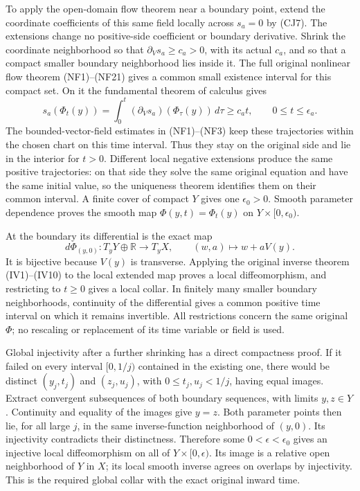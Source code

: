 \documentclass[
  11pt,
]{article}
\begin{document}
To apply the open-domain flow theorem near a boundary point, extend the
coordinate coefficients of this same field locally across \(s_a=0\) by
(CJ7). The extensions change no positive-side coefficient or boundary
derivative. Shrink the coordinate neighborhood so that
\(\partial_Vs_a\geq c_a>0\), with its actual \(c_a\), and so that a
compact smaller boundary neighborhood lies inside it. The full original
nonlinear flow theorem (NF1)--(NF21) gives a common small existence
interval for this compact set. On it the fundamental theorem of calculus
gives \[
 s_a(\Phi_t(y))=\int_0^t
               (\partial_Vs_a)(\Phi_\tau(y))\,d\tau
       \geq c_at,\qquad 0\leq t\leq\epsilon_a .
 \tag{CJ9}
\] The bounded-vector-field estimates in (NF1)--(NF3) keep these
trajectories within the chosen chart on this time interval. Thus they
stay on the original side and lie in the interior for \(t>0\). Different
local negative extensions produce the same positive trajectories: on
that side they solve the same original equation and have the same
initial value, so the uniqueness theorem identifies them on their common
interval. A finite cover of compact \(Y\) gives one \(\epsilon_0>0\).
Smooth parameter dependence proves the smooth map
\(\Phi(y,t)=\Phi_t(y)\) on \(Y\times[0,\epsilon_0)\).

At the boundary its differential is the exact map \[
 d\Phi_{(y,0)}:T_yY\oplus\mathbb R\longrightarrow T_yX,
       \qquad (w,a)\longmapsto w+aV(y).
 \tag{CJ10}
\] It is bijective because \(V(y)\) is transverse. Applying the original
inverse theorem (IV1)--(IV10) to the local extended map proves a local
diffeomorphism, and restricting to \(t\geq0\) gives a local collar. In
finitely many smaller boundary neighborhoods, continuity of the
differential gives a common positive time interval on which it remains
invertible. All restrictions concern the same original \(\Phi\); no
rescaling or replacement of its time variable or field is used.

Global injectivity after a further shrinking has a direct compactness
proof. If it failed on every interval \([0,1/j)\) contained in the
existing one, there would be distinct \((y_j,t_j)\) and \((z_j,u_j)\),
with \(0\leq t_j,u_j<1/j\), having equal images. Extract convergent
subsequences of both boundary sequences, with limits \(y,z\in Y\).
Continuity and equality of the images give \(y=z\). Both parameter
points then lie, for all large \(j\), in the same inverse-function
neighborhood of \((y,0)\). Its injectivity contradicts their
distinctness. Therefore some \(0<\epsilon<\epsilon_0\) gives an
injective local diffeomorphism on all of \(Y\times[0,\epsilon)\). Its
image is a relative open neighborhood of \(Y\) in \(X\); its local
smooth inverse agrees on overlaps by injectivity. This is the required
global collar with the exact original inward time.
\end{document}
